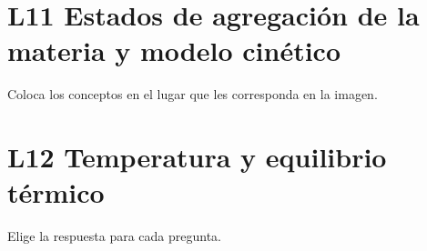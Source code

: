 \documentclass[12pt,addpoints]{evalua}
\begin{document}
\begin{questions}
\begin{multicols}{2}
\end{multicols}

\section{L11 Estados de agregación de la materia y modelo cinético}

      \begin{minipage}[t][][b]{.46\textwidth}
            \question[9] Coloca los conceptos en el lugar que les corresponda en la imagen.\\

            \large
                     
      \end{minipage}\qquad\qquad%
      \begin{minipage}[t][][b]{.285\textwidth}
            \fi
      \end{minipage}

\section{L12 Temperatura y equilibrio térmico}

      \question[10] Elige la respuesta para cada pregunta.
      \begin{multicols}{2}
            \begin{parts}\footnotesize


\end{parts}
\end{multicols}
\end{questions}
\end{document}
